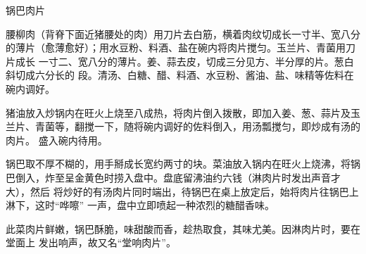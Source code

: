 \begin{recipe}{锅巴肉片}

\ingredients


\preparation

\step 腰柳肉（背脊下面近猪腰处的肉）用刀片去白筋，横着肉纹切成长一寸半、宽八分
的薄片（愈薄愈好）；用水豆粉、料酒、盐在碗内将肉片搅匀。玉兰片、青菌用刀片成长
一寸二、宽八分的薄片。姜、蒜去皮，切成三分见方、半分厚的片。葱白斜切成六分长的
段。清汤、白糖、醋、料酒、水豆粉、酱油、盐、味精等佐料在碗内调好。

\step 猪油放入炒锅内在旺火上烧至八成热，将肉片倒入拨散，即加入姜、葱、蒜片及玉
兰片、青菌等，翻搅一下，随将碗内调好的佐料倒入，用汤瓢搅匀，即炒成有汤的肉片。
盛入碗内待用。

\step 锅巴取不厚不糊的，用手掰成长宽约两寸的块。菜油放入锅内在旺火上烧沸，将锅
巴倒入，炸至呈金黄色时捞入盘中。盘底留沸油约六钱（淋肉片时发出声音才大），然后
将炒好的有汤肉片同时端出，待锅巴在桌上放定后，始将肉片往锅巴上淋下，这时“哗嚓”
一声，盘中立即喷起一种浓烈的糖醋香味。

\features

此菜肉片鲜嫩，锅巴酥脆，味甜酸而香，趁热取食，其味尤美。因淋肉片时，要在堂面上
发出响声，故又名“堂响肉片”。

\end{recipe}

